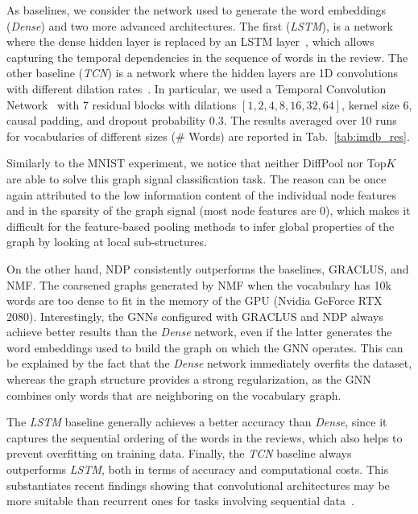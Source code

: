 \documentclass[journal]{IEEEtran}
\begin{document}
As baselines, we consider the network used to generate the word embeddings (\textit{Dense}) and two more advanced architectures.
The first (\textit{LSTM}), is a network where the dense hidden layer is replaced by an LSTM layer~\cite{hochreiter1997long}, which allows capturing the temporal dependencies in the sequence of words in the review.
The other baseline (\textit{TCN}) is a network where the hidden layers are 1D convolutions with different dilation rates~\cite{oord2016wavenet}.
In particular, we used a Temporal Convolution Network~\cite{bai2018empirical} with 7 residual blocks with dilations $[1, 2, 4, 8, 16, 32, 64]$, kernel size 6, causal padding, and dropout probability 0.3.
The results averaged over 10 runs for vocabularies of different sizes (\# Words) are reported in Tab.~\ref{tab:imdb_res}.

Similarly to the MNIST experiment, we notice that neither DiffPool nor Top$K$ are able to solve this graph signal classification task.
The reason can be once again attributed to the low information content of the individual node features and in the sparsity of the graph signal (most node features are 0), which makes it difficult for the feature-based pooling methods to infer global properties of the graph by looking at local sub-structures. 

On the other hand, NDP consistently outperforms the baselines, GRACLUS, and NMF. 
The coarsened graphs generated by NMF when the vocabulary has 10k words are too dense to fit in the memory of the GPU (Nvidia GeForce RTX 2080).
Interestingly, the GNNs configured with GRACLUS and NDP always achieve better results than the \textit{Dense} network, even if the latter generates the word embeddings used to build the graph on which the GNN operates. This can be explained by the fact that the \textit{Dense} network immediately overfits the dataset, whereas the graph structure provides a strong regularization, as the GNN combines only words that are neighboring on the vocabulary graph.  

The \textit{LSTM} baseline generally achieves a better accuracy than \textit{Dense}, since it captures the sequential ordering of the words in the reviews, which also helps to prevent overfitting on training data.
Finally, the \textit{TCN} baseline always outperforms \textit{LSTM}, both in terms of accuracy and computational costs. 
This substantiates recent findings showing that convolutional architectures may be more suitable than recurrent ones for tasks involving sequential data~\cite{bai2018empirical}.
\end{document}
